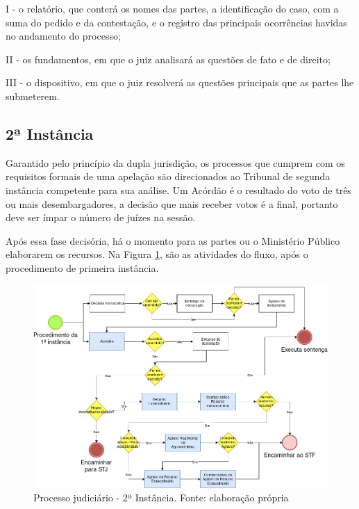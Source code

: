 \begin{citacao}
I - o relatório, que conterá os nomes das partes, a identificação do caso, com a suma do pedido e da contestação, e o registro das principais ocorrências havidas no andamento do processo;

II - os fundamentos, em que o juiz analisará as questões de fato e de direito;

III - o dispositivo, em que o juiz resolverá as questões principais que as partes lhe submeterem. 
\end{citacao}

\subsection{2ª Instância}

Garantido pelo princípio da dupla jurisdição, os processos que cumprem com os requisitos formais de uma apelação são direcionados ao Tribunal de segunda instância competente para sua análise. Um Acórdão é o resultado do voto de três ou mais desembargadores, a decisão que mais receber votos é a final, portanto deve ser ímpar o número de juízes na sessão. 

Após essa fase decisória, há o momento para as partes ou o Ministério Público elaborarem os recursos. Na Figura \ref{fig:processoSegunda}, são as atividades do fluxo, após o procedimento de primeira instância.

\begin{figure}[ht]
	\centering
    \includegraphics[keepaspectratio=true,scale=0.4]{figuras/processoSegunda}
	\caption[Processo judiciário - 2ª Instância]{Processo judiciário - 2ª Instância. Fonte: elaboração própria}
	\label{fig:processoSegunda}
\end{figure}

